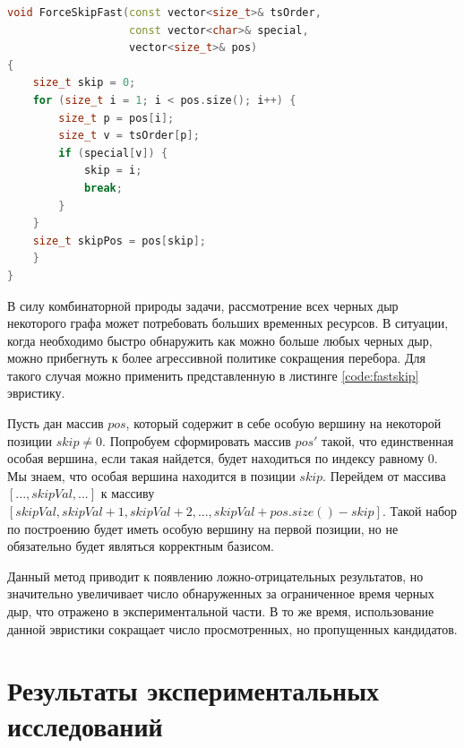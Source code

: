 \documentclass[12pt,a4paper,oneside,openany]{article}
\theoremstyle{definition}
\theoremstyle{lemma}
\theoremstyle{remark}
\begin{document}
\begin{lstlisting}[language=C++, caption=Пропуск большого числа кандидатов. Допускаются ложно-отрицательные результаты., label=code:fastskip]
void ForceSkipFast(const vector<size_t>& tsOrder,
                   const vector<char>& special,
                   vector<size_t>& pos)
{
    size_t skip = 0;
    for (size_t i = 1; i < pos.size(); i++) {
        size_t p = pos[i];
        size_t v = tsOrder[p];
        if (special[v]) {
            skip = i;
            break;
        }
    }
    size_t skipPos = pos[skip];
    }
}
\end{lstlisting}


В силу комбинаторной природы задачи, рассмотрение всех черных дыр некоторого графа может
потребовать больших временных ресурсов. В ситуации, когда необходимо быстро обнаружить
как можно больше любых черных дыр, можно прибегнуть к более агрессивной политике сокращения
перебора. Для такого случая можно применить представленную в листинге \ref{code:fastskip}
эвристику.

Пусть дан массив $pos$, который содержит в себе особую вершину на некоторой позиции $skip \neq 0$.
Попробуем сформировать массив $pos'$ такой, что единственная особая вершина, если такая найдется,
будет находиться по индексу равному $0$.
Мы знаем, что особая вершина  находится в позиции $skip$. Перейдем от массива $[..., skipVal, ...]$ к массиву
$[skipVal, skipVal + 1, skipVal + 2, ... , skipVal + pos.size() - skip]$.
Такой набор по построению будет иметь особую вершину на первой позиции, но не обязательно будет являться корректным базисом.

Данный метод приводит к появлению ложно-отрицательных результатов, но значительно увеличивает число обнаруженных за
ограниченное время черных дыр, что отражено в экспериментальной части. В то же время, использование данной эвристики
сокращает число просмотренных, но пропущенных кандидатов.

\cleardoublepage
\section{Результаты экспериментальных исследований}\label{sec:experimentalresults}
\end{document}
